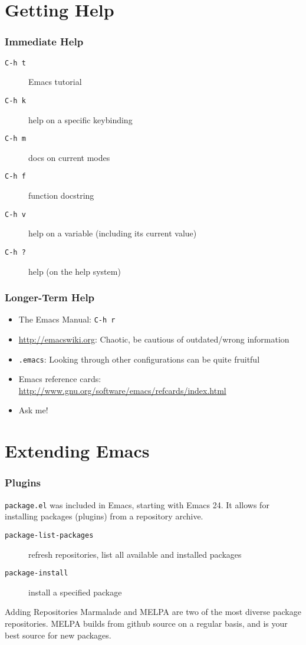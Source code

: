 \documentclass{beamer}
\begin{document}
\section{Getting Help}
\begin{frame}
  \frametitle{Immediate Help}
  \begin{description}
  \item[{\tt C-h t}] Emacs tutorial
  \item[{\tt C-h k}] help on a specific keybinding
  \item[{\tt C-h m}] docs on current modes
  \item[{\tt C-h f}] function docstring
  \item[{\tt C-h v}] help on a variable (including its current value)
  \item[{\tt C-h ?}] help (on the help system)
  \end{description}
\end{frame}
\begin{frame}
  \frametitle{Longer-Term Help}

  \begin{itemize}
  \item The Emacs Manual: {\tt C-h r}
  \item \url{http://emacswiki.org}: Chaotic, be cautious of
    outdated/wrong information
  \item {\tt .emacs}: Looking through other configurations can be
    quite fruitful
  \item Emacs reference cards: \url{http://www.gnu.org/software/emacs/refcards/index.html}
  \item Ask me!
  \end{itemize}
\end{frame}
\section{Extending Emacs}
\begin{frame}
  \frametitle{Plugins}
  {\tt package.el} was included in Emacs, starting with Emacs 24. It
  allows for installing packages (plugins) from a repository archive.
  \begin{description}
  \item[{\tt package-list-packages}] refresh repositories, list all
    available and installed packages
  \item[{\tt package-install}] install a specified package
  \end{description}
  \begin{block}{Adding Repositories}
    Marmalade and MELPA are two of the most diverse package
    repositories. MELPA builds from github source on a regular basis,
    and is your best source for new packages.
  \end{block}
\end{frame}
\end{document}
